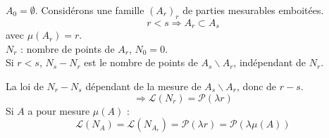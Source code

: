 \begin{dem}
$A_0=\emptyset$. Considérons une famille $(A_r)_r$ de parties mesurables emboitées.
	\[r<s\Rightarrow A_r\subset A_s\]
avec $\mu(A_r)=r$.\\
$N_r$ : nombre de points de $A_r$, $N_0=0$.\\
Si $r<s$, $N_s-N_r$ est le nombre de points de $A_s\backslash A_r$, indépendant de $N_r$.

\bigskip
La loi de $N_r-N_s$ dépendant de la mesure de $A_s\backslash A_r$, donc de $r-s$.
	\[\Rightarrow \mathcal{L}(N_r)=\mathcal{P}(\lambda r)\]
Si $A$ a pour mesure $\mu(A)$ :
	\[\mathcal{L}(N_A)=\mathcal{L}(N_{A_r})=\mathcal{P}(\lambda r)=\mathcal{P}(\lambda \mu(A))\]
\end{dem}
